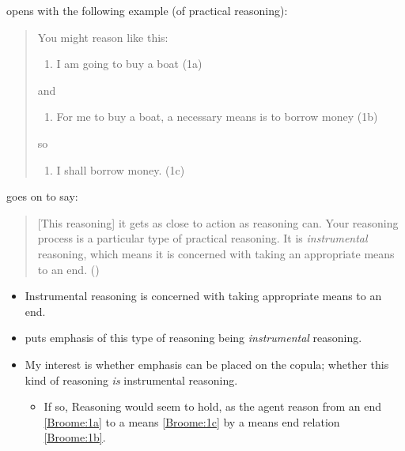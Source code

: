 \documentclass[10pt]{article}
\newcommand{\hozlinedash}[0]{%
  \noindent\hdashrule[0.5ex][c]{\textwidth}{.1pt}{2.5pt}
}
\newcommand{\schemaName}[1]{\textsf{#1}}
\begin{document}
\hozlinedash

\citeauthor{Broome:2002aa} opens  with the following example (of practical reasoning):

\begin{quote}
  You might reason like this:

  \begin{enumerate}[label={\color{white} (1\alph*)}, ref=(1\alph*)]
  \item\label{Broome:1a} I am going to buy a boat \hfill (1a)
  \end{enumerate}

  and

  \begin{enumerate}[label={\color{white} (1\alph*)}, ref=(1\alph*), resume]
  \item\label{Broome:1b} For me to buy a boat, a necessary means is to borrow money \hfill (1b)
  \end{enumerate}
  so

  \begin{enumerate}[label={\color{white} (1\alph*)}, ref=(1\alph*), resume]
  \item\label{Broome:1c} I shall borrow money. \hfill (1c)
  \end{enumerate}

\end{quote}

\citeauthor{Broome:2002aa} goes on to say:

\begin{quote}
  [This reasoning] it gets as close to action as reasoning can.
  Your reasoning process is a particular type of practical reasoning.
  It is \emph{instrumental} reasoning, which means it is concerned with taking an appropriate means to an end.\nolinebreak
  \mbox{}\hfill\mbox{(\citeyear[86]{Broome:2002aa})}
\end{quote}

\begin{itemize}[noitemsep]
\item Instrumental reasoning is concerned with taking appropriate means to an end.
\item \citeauthor{Broome:2002aa} puts emphasis of this type of reasoning being \emph{instrumental} reasoning.
\item My interest is whether emphasis can be placed on the copula; whether this kind of reasoning \emph{is} instrumental reasoning.
  \begin{itemize}
  \item If so, \schemaName{Reasoning} would seem to hold, as the agent reason from an end \ref{Broome:1a} to a means \ref{Broome:1c} by a means end relation \ref{Broome:1b}.
  \end{itemize}
\end{itemize}
\end{document}
